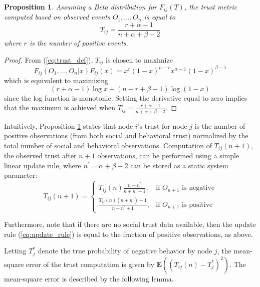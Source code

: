 \documentclass[conference]{IEEEtran}
\newtheorem{proposition}{Proposition}
\begin{document}
\begin{proposition}
\label{prop:trust_metric}
Assuming a Beta distribution for $F_{ij}(T)$, the trust metric computed based on observed events $O_{1}, \ldots, O_{n}$ is equal to
\begin{equation}
T_{ij} = \frac{r + \alpha -1}{n + \alpha + \beta-2}
\end{equation}
where $r$ is the number of positive events.
\end{proposition}

\begin{proof}
From (\ref{eq:trust_def}), $T_{ij}$ is chosen to maximize
\begin{displaymath}
F_{ij}(O_{1}, \ldots, O_{n}|x)F_{ij}(x) = x^{r}(1-x)^{n-r}x^{\alpha-1}(1-x)^{\beta-1}
\end{displaymath}
which is equivalent to maximizing 
\begin{displaymath}
(r+\alpha-1)\log{x} + (n-r+\beta-1)\log{(1-x)}
\end{displaymath}
since the log function is monotonic.  Setting the derivative equal to zero implies that the maximum is achieved when $T_{ij} = \frac{r+\alpha-1}{n+\alpha+\beta-2}$.
\end{proof}

Intuitively, Proposition \ref{prop:trust_metric} states that node $i$'s trust for node $j$ is the  number of positive observations (from both social and behavioral trust) normalized by the total number of social and behavioral observations. Computation of $T_{ij}(n+1)$, the observed trust after $n+1$ observations, can be performed using a simple linear update rule, where $n^{\prime} = \alpha + \beta -2$ can be stored as a static system parameter:
\begin{equation}
\label{eq:update_rule}
T_{ij}(n+1) = \left\{
\begin{array}{cc}
T_{ij}(n)\frac{n+n^{\prime}}{n+n^{\prime}+1}, & \mbox{if $O_{n+1}$ is negative} \\
\frac{T_{ij}(n)(n+n^{\prime}) + 1}{n+n^{\prime}+1}, & \mbox{if $O_{n+1}$ is positive}
\end{array}
\right.
\end{equation}

Furthermore, note that if there are no social trust data available, then the update rule (\ref{eq:update_rule}) is equal to the fraction of positive observations, as above.


Letting $T_{j}^{\ast}$ denote the true probability of negative behavior by node $j$, the mean-square error of the trust computation is given by $\mathbf{E}((T_{ij}(n)-T_{j}^{\ast})^{2})$.  The mean-square error is described by the following lemma.
\end{document}
